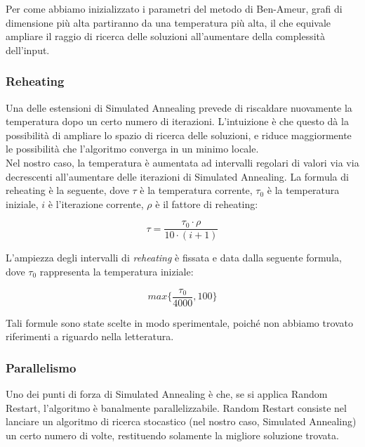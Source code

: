 \noindent Per come abbiamo inizializzato i parametri del metodo di Ben-Ameur, grafi di dimensione più alta partiranno da una temperatura più alta, il che equivale ampliare il raggio di ricerca delle soluzioni all'aumentare della complessità dell'input.

\subsubsection{Reheating}

Una delle estensioni di Simulated Annealing prevede di riscaldare nuovamente la temperatura dopo un certo numero di iterazioni. L'intuizione è che questo dà la possibilità di ampliare lo spazio di ricerca delle soluzioni, e riduce maggiormente le possibilità che l'algoritmo converga in un minimo locale. \\

\noindent Nel nostro caso, la temperatura è aumentata ad intervalli regolari di valori via via decrescenti all'aumentare delle iterazioni di Simulated Annealing. La formula di reheating è la seguente, dove $\tau{}$ è la temperatura corrente, $\tau{}_0$ è la temperatura iniziale, $i$ è l'iterazione corrente, $\rho$ è il fattore di reheating:

\begin{equation}
    \tau{} = \frac{\tau{}_0 \cdot \rho{}}{10 \cdot (i + 1)}
\end{equation}

L'ampiezza degli intervalli di \textit{reheating} è fissata e data dalla seguente formula, dove $\tau{}_0$ rappresenta la temperatura iniziale:

\begin{equation}
    max\{ \frac{\tau{}_0}{4000}, 100 \}
\end{equation}

\noindent Tali formule sono state scelte in modo sperimentale, poiché non abbiamo trovato riferimenti a riguardo nella letteratura.

\subsubsection{Parallelismo}

Uno dei punti di forza di Simulated Annealing è che, se si applica Random Restart, l'algoritmo è banalmente parallelizzabile.
Random Restart consiste nel lanciare un algoritmo di ricerca stocastico (nel nostro caso, Simulated Annealing) un certo numero di volte, restituendo solamente la migliore soluzione trovata. \\

